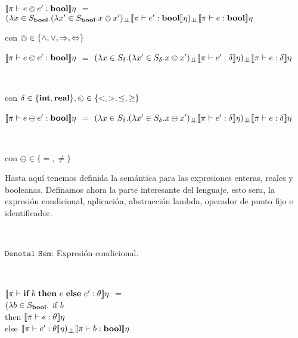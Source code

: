 \noindent
$\llbracket \pi \vdash e \owedge e' : \textbf{bool} \rrbracket\eta$ $=$ \\
				\indent \indent \indent $(\lambda x \in S_{\textbf{bool}} . 
											(\lambda x' \in S_{\textbf{bool}} . x \owedge x')_{\bot \!\!\! \bot}
													\llbracket \pi \vdash e' : \textbf{bool} \rrbracket\eta)_{\bot \!\!\! \bot}
														\llbracket \pi \vdash e : \textbf{bool} \rrbracket\eta$

\begin{center}
con $\owedge \in \{\wedge,\vee,\Rightarrow,\Leftrightarrow\}$
\end{center}

\begin{center}

$\llbracket \pi \vdash e \olessthan e' : \textbf{bool} \rrbracket\eta$ $=$ $(\lambda x \in S_\delta . 
											(\lambda x' \in S_\delta . x \olessthan x')_{\bot \!\!\! \bot}
													\llbracket \pi \vdash e' : \delta \rrbracket\eta)_{\bot \!\!\! \bot}
														\llbracket \pi \vdash e : \delta \rrbracket\eta$

\

con $\delta \in \{\textbf{int}, \textbf{real} \}, \olessthan \in \{<,>,\leq,\geq\}$
\end{center}

\begin{center}

$\llbracket \pi \vdash e \ominus e' : \textbf{bool} \rrbracket\eta$ $=$ $(\lambda x \in S_\delta . 
											(\lambda x' \in S_\delta . x \ominus x')_{\bot \!\!\! \bot}
													\llbracket \pi \vdash e' : \delta \rrbracket\eta)_{\bot \!\!\! \bot}
														\llbracket \pi \vdash e : \delta \rrbracket\eta$

\

con $\ominus \in \{=,\neq\}$
\end{center}

Hasta aqu\'i tenemos definida la sem\'antica para las expresiones enteras,
reales y booleanas. Definamos ahora la parte interesante del lenguaje, esto 
sera, la expresi\'on condicional, aplicaci\'on, abstracci\'on lambda, operador
de punto fijo e identificador.

\

\noindent
$\texttt{Denotal Sem:}$ Expresi\'on condicional.\

\

$\llbracket \pi \vdash \textbf{if} \ b \ \textbf{then} \ e \ \textbf{else} \ e' : \theta \rrbracket\eta$ $=$\\
		\indent \indent \indent $(\lambda b \in S_{\textbf{bool}} .$ if $b$ \\
		\indent \indent \indent \indent \indent \indent \indent 
											then $\llbracket \pi \vdash e : \theta \rrbracket\eta$\\
		\indent \indent \indent \indent \indent \indent \indent 
											else $\llbracket \pi \vdash e' : \theta \rrbracket\eta)_{\bot \!\!\! \bot}\llbracket \pi \vdash b : \textbf{bool} \rrbracket\eta$

